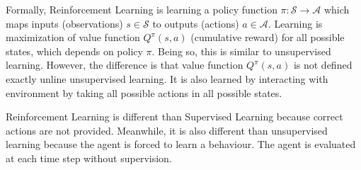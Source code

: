 Formally, Reinforcement Learning is learning a policy function 
$\pi \colon \mathcal{S} \rightarrow \mathcal{A}$ which maps 
inputs (observations) $s \in \mathcal{S}$ to outputs (actions) $a \in \mathcal{A}$. 
Learning is maximization of value function $Q^{\pi}(s,a)$ (cumulative reward) for all possible states, which depends on policy $\pi$. 
Being so, this is similar to unsupervised learning. 
However, the difference is that value function $Q^{\pi}(s,a)$ is not defined exactly unline unsupervised learning. 
It is also learned by interacting with environment by taking all possible actions in all possible states. 

Reinforcement Learning is different than Supervised Learning because correct actions are not provided. 
Meanwhile, it is also different than unsupervised learning because the agent is forced to learn a behaviour. 
The agent is evaluated at each time step without supervision.
